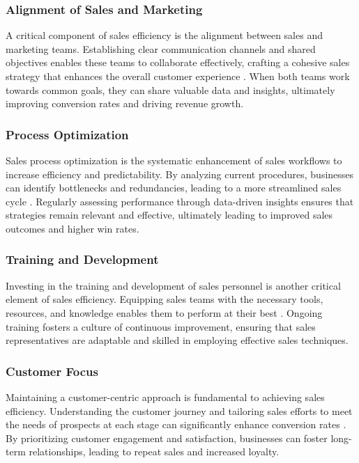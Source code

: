 \subsubsection{Alignment of Sales and Marketing}
A critical component of sales efficiency is the alignment between sales and marketing teams. Establishing clear communication channels and shared objectives enables these teams to collaborate effectively, crafting a cohesive sales strategy that enhances the overall customer experience \cite{graygroup}. When both teams work towards common goals, they can share valuable data and insights, ultimately improving conversion rates and driving revenue growth.

\subsubsection{Process Optimization}
Sales process optimization is the systematic enhancement of sales workflows to increase efficiency and predictability. By analyzing current procedures, businesses can identify bottlenecks and redundancies, leading to a more streamlined sales cycle \cite{trackmage, floworks}. Regularly assessing performance through data-driven insights ensures that strategies remain relevant and effective, ultimately leading to improved sales outcomes and higher win rates.

\subsubsection{Training and Development}
Investing in the training and development of sales personnel is another critical element of sales efficiency. Equipping sales teams with the necessary tools, resources, and knowledge enables them to perform at their best \cite{pipedrive}. Ongoing training fosters a culture of continuous improvement, ensuring that sales representatives are adaptable and skilled in employing effective sales techniques.

\subsubsection{Customer Focus}
Maintaining a customer-centric approach is fundamental to achieving sales efficiency. Understanding the customer journey and tailoring sales efforts to meet the needs of prospects at each stage can significantly enhance conversion rates \cite{graygroup, disruptivelabs}. By prioritizing customer engagement and satisfaction, businesses can foster long-term relationships, leading to repeat sales and increased loyalty.



